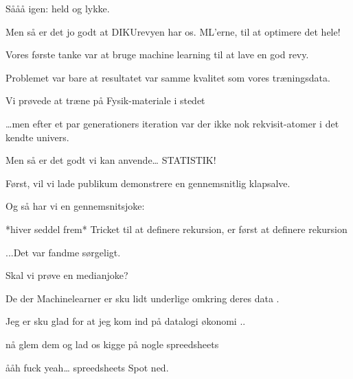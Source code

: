 \documentclass[a4paper,11pt]{article}
\begin{document}
\begin{sketch}

 Sååå igen: held og lykke.

 Men så er det jo godt at DIKUrevyen har os. ML’erne, til at optimere det hele!

 Vores første tanke var at bruge machine learning til at lave en god revy.

 Problemet var bare at resultatet var samme kvalitet som vores træningsdata.

 Vi prøvede at træne på Fysik-materiale i stedet

 …men efter et par generationers iteration var der ikke nok rekvisit-atomer i det kendte univers.

 Men så er det godt vi kan anvende… STATISTIK!

 Først, vil vi lade publikum demonstrere en gennemsnitlig klapsalve.


 Og så har vi en gennemsnitsjoke:

 *hiver seddel frem* Tricket til at definere rekursion, er først at definere rekursion

 ...Det var fandme sørgeligt.

 Skal vi prøve en medianjoke?



 De der Machinelearner er sku lidt underlige omkring deres data .

 Jeg er sku glad for at jeg kom ind på datalogi økonomi ..

 nå glem dem og lad os kigge på nogle spreedsheets

 ååh fuck yeah… spreedsheets
Spot ned.


\end{sketch}
\end{document}
